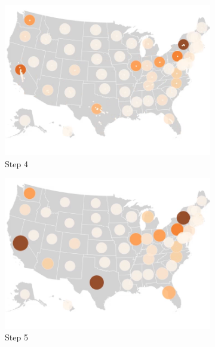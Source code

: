 \begin{figure}[!htb]
    \begin{subfigure}[b]{0.31\textwidth}
        \centering
        \includegraphics[width=\textwidth]{images/results/dot_cartogram/transition_4.png}
        \caption[]%
        {{\small Step 4}}
    \end{subfigure}
    \hfill
    \begin{subfigure}[b]{0.31\textwidth}
        \centering
        \includegraphics[width=\textwidth]{images/results/dot_cartogram/transition_5.png}
        \caption[]%
        {{\small Step 5}}
    \end{subfigure}
    \hfill
    \begin{subfigure}[b]{0.31\textwidth}
        \centering

\end{subfigure}
\end{figure}
